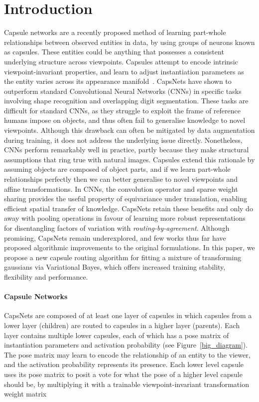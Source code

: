 \documentclass[letterpaper]{article} \usepackage{aaai20}  \usepackage{times}  \usepackage{helvet} \usepackage{courier}  \usepackage[hyphens]{url}  \usepackage{graphicx} \urlstyle{rm} \def\UrlFont{\rm}  \usepackage{graphicx}  \frenchspacing  \setlength{\pdfpagewidth}{8.5in}  \setlength{\pdfpageheight}{11in}  \nocopyright
\begin{document}
\section{Introduction}
Capsule networks are a recently proposed method of learning part-whole relationships between observed entities in data, by using groups of neurons known as capsules. These entities could be anything that possesses a consistent underlying structure across viewpoints. Capsules attempt to encode intrinsic viewpoint-invariant properties, and learn to adjust instantiation parameters as the entity varies across its appearance manifold~\cite{hinton2011transforming}. CapsNets have shown to outperform standard Convolutional Neural Networks (CNNs) in specific tasks involving shape recognition and overlapping digit segmentation. These tasks are difficult for standard CNNs, as they struggle to exploit the frame of reference humans impose on objects, and thus often fail to generalise knowledge to novel viewpoints. Although this drawback can often be mitigated by data augmentation during training, it does not address the underlying issue directly. Nonetheless, CNNs perform remarkably well in practice, partly because they make structural assumptions that ring true with natural images. Capsules extend this rationale by assuming objects are composed of object parts, and if we learn part-whole relationships perfectly then we can better generalise to novel viewpoints and affine transformations. In CNNs, the convolution operator and sparse weight sharing provides the useful property of equivariance under translation, enabling efficient spatial transfer of knowledge. CapsNets retain these benefits and only do away with pooling operations in favour of learning more robust representations for disentangling factors of variation with \textit{routing-by-agreement}. Although promising, CapsNets remain underexplored, and few works thus far have proposed algorithmic improvements to the original formulations. In this paper, we propose a new capsule routing algorithm for fitting a mixture of transforming gaussians via Variational Bayes, which offers increased training stability, flexibility and performance. 
\paragraph{Capsule Networks}\label{sec: Capsule Networks}
CapsNets are composed of at least one layer of capsules in which capsules  from a lower layer  (children) are routed to capsules  in a higher layer  (parents). Each layer contains multiple lower capsules, each of which has a pose matrix  of instantiation parameters and activation probability  (see Figure~\ref{big_diagram}). The pose matrix may learn to encode the relationship of an entity to the viewer, and the activation probability  represents its presence. Each lower level capsule uses its pose matrix  to posit a vote for what the pose of a higher level capsule should be, by multiplying it with a trainable viewpoint-invariant transformation weight matrix 
\end{document}
